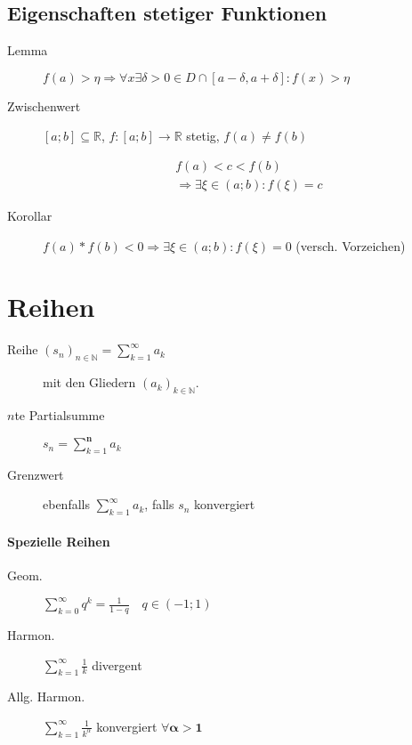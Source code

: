 \subsection{Eigenschaften stetiger Funktionen}

\begin{description}
  \item[Lemma] $f(a) > \eta \Rightarrow \forall x \exists \delta > 0 \in D \cap [a - \delta, a + \delta]: f(x) > \eta$
  \item[Zwischenwert]
    $[a; b] \subseteq \mathbb{R}$, $f: [a; b] \rightarrow \mathbb{R}$ stetig, $f(a) \neq f(b)$

    \begin{gather*}
      f(a) < c < f(b) \\
      \Rightarrow \exists \xi \in (a; b): f(\xi) = c
    \end{gather*}

  \item [Korollar] $f(a) * f(b) < 0 \Rightarrow \exists \xi \in (a; b): f(\xi) = 0$
        (versch. Vorzeichen)
\end{description}

\section{Reihen}

\begin{description}
  \item [Reihe $(s_n)_{n \in \mathbb{N}} = \sum_{k=1}^\infty a_k$]
        mit den Gliedern $(a_k)_{k \in \mathbb{N}}$.

  \item [$n$te Partialsumme]
        $s_n = \sum_{k=1}^{\mathbf{n}} a_k$

  \item [Grenzwert] ebenfalls $\sum_{k=1}^{\boldsymbol{\infty}} a_k$, falls $s_n$ konvergiert
\end{description}

\paragraph{Spezielle Reihen}

\begin{mzImportant}
  \begin{description}
    \item[Geom.]
      $\sum_{k=0}^\infty q^k = \frac{1}{1- q} \quad q \in (-1;1)$

    \item [Harmon.]
          $\sum_{k=1}^\infty \frac{1}{k}$ divergent

    \item [Allg. Harmon.]
          $\sum_{k=1}^\infty \frac{1}{k^\alpha}$ konvergiert $\forall \mathbf{\alpha > 1}$
  \end{description}
\end{mzImportant}

